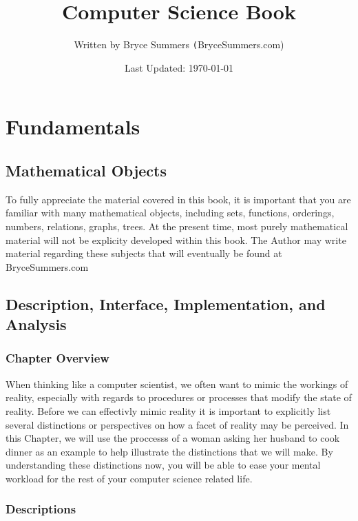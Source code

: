 \documentclass[12pt, letterpaper]{book}
\begin{document}
\title{\color{blue}Computer Science Book}
\author{Written by Bryce Summers \texttt(BryceSummers.com)}
\date{\color{red}Last Updated: \today}
\maketitle


\tableofcontents 


\part{Fundamentals}

\chapter{Mathematical Objects}

To fully appreciate the material covered in this book, it is important that you are familiar with many mathematical objects, including sets, functions, orderings, numbers, relations, graphs, trees. At the present time, most purely mathematical material will not be explicity developed within this book. The Author may write material regarding these subjects that will eventually be found at BryceSummers.com

\chapter[Fundamental Distinctions]{Description, Interface, Implementation, and Analysis}

\section{Chapter Overview}

When thinking like a computer scientist, we often want to mimic the workings of reality, especially with regards to procedures or processes that modify the state of reality. Before we can effectivly mimic reality it is important to explicitly list several distinctions or perspectives on how a facet of reality may be perceived. In this Chapter, we will use the proccesss of a woman asking her husband to cook dinner as an example to help illustrate the distinctions that we will make. By understanding these distinctions now, you will be able to ease your mental workload for the rest of your computer science related life.

\section{Descriptions}
\end{document}
